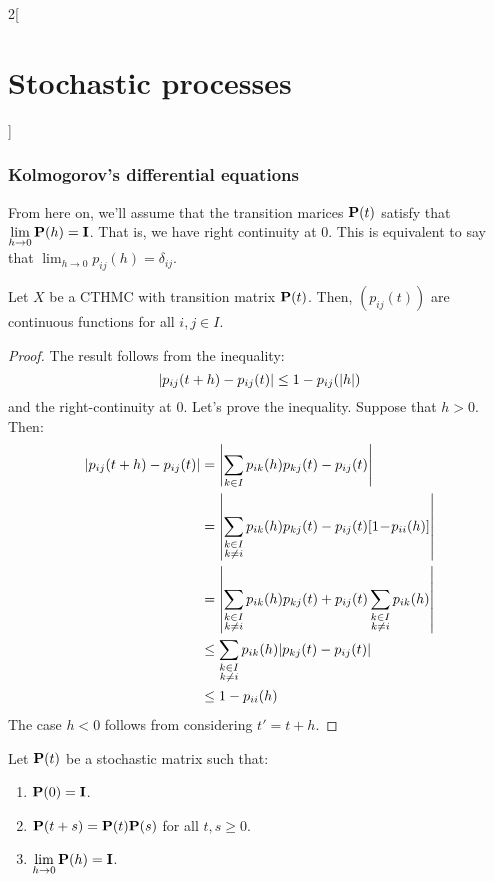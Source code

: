 \documentclass[../../../main_math.tex]{subfiles}
\begin{document}
\begin{multicols}{2}[\section{Stochastic processes}]
  \subsubsection{Kolmogorov's differential equations}
  From here on, we'll assume that the transition marices $\boldsymbol{\mathrm{P}}(t)$ satisfy that $\displaystyle\lim_{h\to 0} \boldsymbol{\mathrm{P}} (h)=\boldsymbol{\mathrm{I}}$. That is, we have right continuity at $0$. This is equivalent to say that $\displaystyle\lim_{h\to 0} p_{ij}(h)=\delta_{ij}$.
  \begin{lemma}
    Let $X$ be a CTHMC with transition matrix $\boldsymbol{\mathrm{P}}(t)$. Then, $(p_{ij}(t))$ are continuous functions for all $i,j\in I$.
  \end{lemma}
  \begin{proof}
    The result follows from the inequality:
    $$
      \abs{p_{ij}(t+h) - p_{ij}(t)}\leq 1-p_{ij}(\abs{h})
    $$
    and the right-continuity at 0. Let's prove the inequality. Suppose that $h>0$. Then:
    \begin{align*}
      \abs{p_{ij}(t+h) - p_{ij}(t)} & = \abs{\sum_{k\in I} p_{ik}(h)p_{kj}(t)-p_{ij}(t)} \\
                                    & =\abs{\sum_{\substack{k \in I                      \\ k\neq i}} p_{ik}(h)p_{kj}(t)-p_{ij}(t)[1\! -\! p_{ii}(h)]}\\
                                    & =\abs{\sum_{\substack{k \in I                      \\ k\neq i}} p_{ik}(h)p_{kj}(t)+p_{ij}(t)\sum_{\substack{k \in I\\ k\neq i}}p_{ik}(h)}\\
                                    & \leq \sum_{\substack{k \in I                       \\ k\neq i}} p_{ik}(h)\abs{p_{kj}(t)-p_{ij}(t)}\\
                                    & \leq 1-p_{ii}(h)
    \end{align*}
    The case $h<0$ follows from considering $t'=t+h$.
  \end{proof}
  \begin{theorem}
    Let $\boldsymbol{\mathrm{P}}(t)$ be a stochastic matrix such that:
    \begin{enumerate}\label{SP:StochMatrixProps}
      \item $\boldsymbol{\mathrm{P}}(0) = \boldsymbol{\mathrm{I}}$.
      \item $\boldsymbol{\mathrm{P}}(t+s) = \boldsymbol{\mathrm{P}}(t)\boldsymbol{\mathrm{P}}(s)$ for all $t,s\geq 0$.
      \item $\displaystyle\lim_{h\to 0} \boldsymbol{\mathrm{P}} (h)=\boldsymbol{\mathrm{I}}$.

\end{enumerate}
\end{theorem}
\end{multicols}
\end{document}
